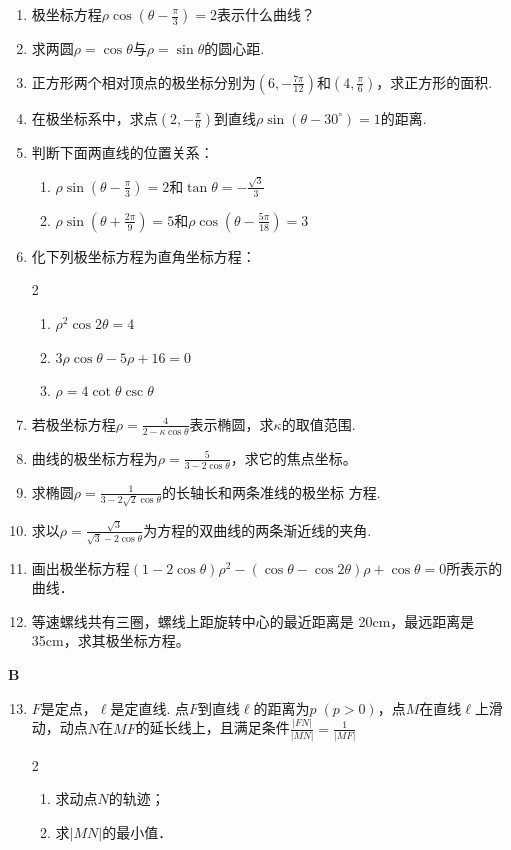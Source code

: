 \begin{enumerate}
    \item 极坐标方程$\rho\cos\left(\theta-\frac{\pi}{3}\right)=2$表示什么曲线？
    \item 求两圆$\rho=\cos\theta$与$\rho=\sin\theta$的圆心距.
    \item 正方形两个相对顶点的极坐标分别为$\left(6,-\frac{7\pi}{12}\right)$和$\left(4,\frac{\pi}{6}\right)$，求正方形的面积.
    \item 在极坐标系中，求点$\left(2,-\frac{\pi}{6}\right)$到直线$\rho\sin(\theta-30^{\circ})=1$的距离.
    \item 判断下面两直线的位置关系：
\begin{enumerate}[(1)]
    \item $\rho\sin \left(\theta-\frac{\pi}{3}\right)=2$和$\tan\theta=-\frac{\sqrt{3}}{3}$
    \item $\rho\sin \left(\theta+\frac{2\pi}{9}\right)=5$和$\rho\cos\left(\theta-\frac{5\pi}{18}\right)=3$
\end{enumerate}
\item 化下列极坐标方程为直角坐标方程：
\begin{multicols}{2}
 \begin{enumerate}[(1)]
    \item $\rho^2\cos 2\theta=4$
    \item $3\rho\cos\theta-5\rho+16=0$
    \item $\rho=4\cot\theta \csc\theta$
\end{enumerate}   
\end{multicols}

\item 若极坐标方程$\rho=\frac{4}{2-\kappa\cos\theta}$表示椭圆，求$\kappa$的取值范围.
\item 曲线的极坐标方程为$\rho=\frac{5}{3-2\cos\theta}$，求它的焦点坐标。
\item 求椭圆$\rho=\frac{1}{3-2\sqrt{2}\cos\theta}$的长轴长和两条准线的极坐标
方程.
\item 求以$\rho=\frac{\sqrt{3}}{\sqrt{3}-2\cos\theta}$为方程的双曲线的两条渐近线的夹角.
\item 画出极坐标方程$(1-2\cos\theta)\rho^2-(\cos\theta-\cos2\theta)\rho+\cos\theta=0$所表示的曲线．
\item 等速螺线共有三圈，螺线上距旋转中心的最近距离是
20cm，最远距离是35cm，求其极坐标方程。
\end{enumerate}


\begin{center}
    \bfseries B
\end{center}

\begin{enumerate}\setcounter{enumi}{12}
    \item $F$是定点，$\ell$是定直线. 点$F$到直线$\ell$的距离为$p\; (p>0)$，点$M$在直线$\ell$上滑动，动点$N$在$MF$的延长线上，且满足条件$\frac{|FN|}{|MN|}=\frac{1}{|MF|}$
\begin{multicols}{2}
\begin{enumerate}[(1)]
    \item 求动点$N$的轨迹；
    \item 求$|MN|$的最小值．
\end{enumerate}
\end{multicols}
\end{enumerate}
